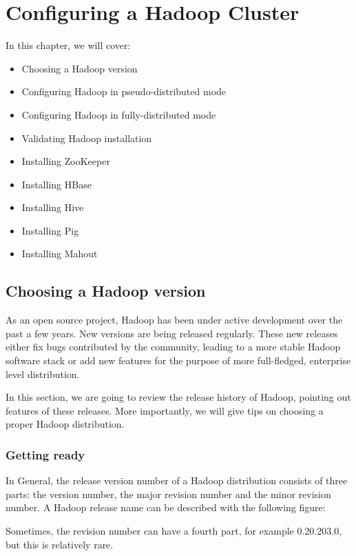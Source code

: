 \chapter{Configuring a Hadoop Cluster}
In this chapter, we will cover:

\begin{itemize}
  \item Choosing a Hadoop version
  \item Configuring Hadoop in pseudo-distributed mode
  \item Configuring Hadoop in fully-distributed mode
  \item Validating Hadoop installation
  \item Installing ZooKeeper
  \item Installing HBase
  \item Installing Hive
  \item Installing Pig
  \item Installing Mahout
\end{itemize}

\section{Choosing a Hadoop version}
As an open source project, Hadoop has been under active development over the past a few years. New versions are being released regularly. These new releases either fix bugs contributed by the community, leading to a more stable Hadoop software stack or add new features for the purpose of more full-fledged, enterprise level distribution.

In this section, we are going to review the release history of Hadoop, pointing out features of these releases. More importantly, we will give tips on choosing a proper Hadoop distribution.

\subsection*{Getting ready}
In General, the release version number of a Hadoop distribution consists of three parts: the version number, the major revision number and the minor revision number. A Hadoop release name can be described with the following figure:

Sometimes, the revision number can have a fourth part, for example 0.20.203.0, but this is relatively rare.

